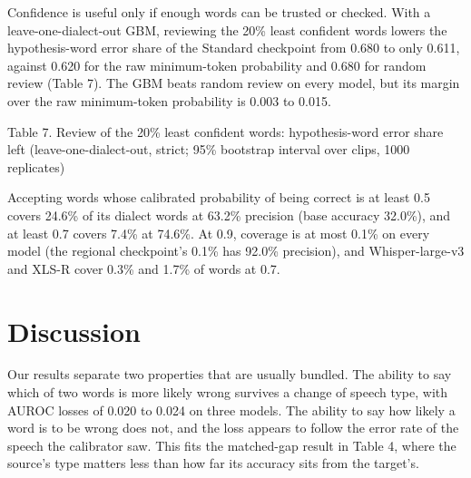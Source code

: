 \documentclass[10pt]{article}
\begin{document}
Confidence is useful only if enough words can be trusted or checked. With a leave-one-dialect-out GBM, reviewing the 20\% least confident words lowers the hypothesis-word error share of the Standard checkpoint from 0.680 to only 0.611, against 0.620 for the raw minimum-token probability and 0.680 for random review (Table 7). The GBM beats random review on every model, but its margin over the raw minimum-token probability is 0.003 to 0.015.


\begin{table}[htb]
\centering
\par\noindent\begin{minipage}{\linewidth}\small Table 7. Review of the 20\% least confident words: hypothesis-word error share left (leave-one-dialect-out, strict; 95\% bootstrap interval over clips, 1000 replicates)\end{minipage}\par\smallskip
\small
{}
\end{table}


Accepting words whose calibrated probability of being correct is at least 0.5 covers 24.6\% of its dialect words at 63.2\% precision (base accuracy 32.0\%), and at least 0.7 covers 7.4\% at 74.6\%. At 0.9, coverage is at most 0.1\% on every model (the regional checkpoint's 0.1\% has 92.0\% precision), and Whisper-large-v3 and XLS-R cover 0.3\% and 1.7\% of words at 0.7.


\section{Discussion}

Our results separate two properties that are usually bundled. The ability to say which of two words is more likely wrong survives a change of speech type, with AUROC losses of 0.020 to 0.024 on three models. The ability to say how likely a word is to be wrong does not, and the loss appears to follow the error rate of the speech the calibrator saw. This fits the matched-gap result in Table 4, where the source's type matters less than how far its accuracy sits from the target's.
\end{document}
